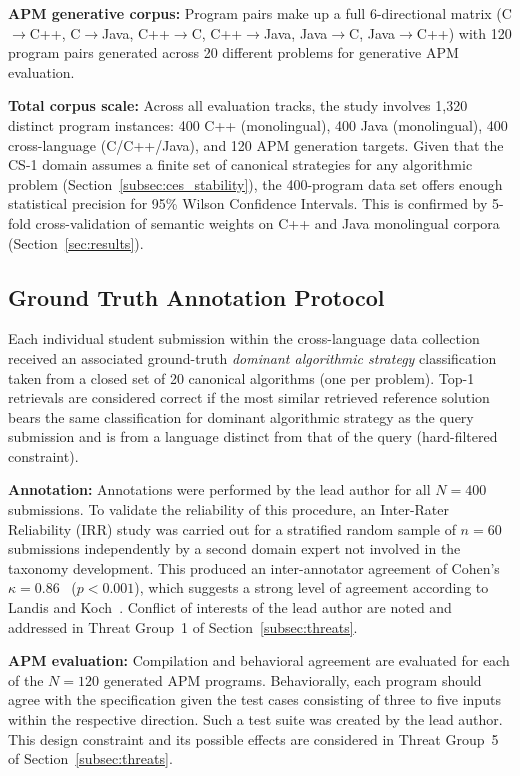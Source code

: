 \textbf{APM generative corpus:} Program pairs make up a full 6-directional matrix (C$\rightarrow$C++, C$\rightarrow$Java, C++$\rightarrow$C, C++$\rightarrow$Java, Java$\rightarrow$C, Java$\rightarrow$C++) with 120 program pairs generated across 20 different problems for generative APM evaluation.

\textbf{Total corpus scale:} Across all evaluation tracks, the study involves 1,320 distinct program instances: 400 C++ (monolingual), 400 Java (monolingual), 400 cross-language (C/C++/Java), and 120 APM generation targets. Given that the CS-1 domain assumes a finite set of canonical strategies for any algorithmic problem (Section~\ref{subsec:ces_stability}), the 400-program data set offers enough statistical precision for 95\% Wilson Confidence Intervals. This is confirmed by 5-fold cross-validation of semantic weights on C++ and Java monolingual corpora (Section~\ref{sec:results}).

\subsection{Ground Truth Annotation Protocol}
\label{subsec:ground_truth}

Each individual student submission within the cross-language data collection received an associated ground-truth \textit{dominant algorithmic strategy} classification taken from a closed set of 20 canonical algorithms (one per problem). Top-1 retrievals are considered correct if the most similar retrieved reference solution bears the same classification for dominant algorithmic strategy as the query submission and is from a language distinct from that of the query (hard-filtered constraint).


\textbf{Annotation:} Annotations were performed by the lead author for all $N=400$ submissions. To validate the reliability of this procedure, an Inter-Rater Reliability (IRR) study was carried out for a stratified random sample of $n=60$ submissions independently by a second domain expert not involved in the taxonomy development. This produced an inter-annotator agreement of Cohen's $\kappa = 0.86$~\cite{ref_cohen1960} ($p < 0.001$), which suggests a strong level of agreement according to Landis and Koch~\cite{ref_landis1977}. Conflict of interests of the lead author are noted and addressed in Threat Group~1 of Section~\ref{subsec:threats}.

\textbf{APM evaluation:} Compilation and behavioral agreement are evaluated for each of the $N=120$ generated APM programs. Behaviorally, each program should agree with the specification given the test cases consisting of three to five inputs within the respective direction. Such a test suite was created by the lead author. This design constraint and its possible effects are considered in Threat Group~5 of Section~\ref{subsec:threats}.

